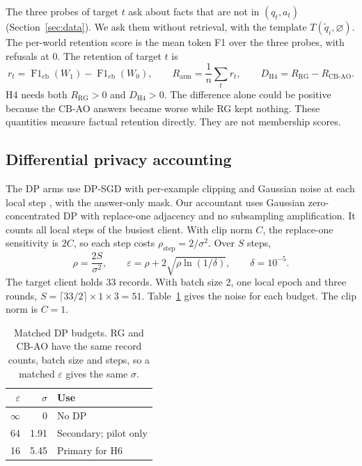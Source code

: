 \documentclass[11pt]{article}
\newcommand{\Fone}{\operatorname{F1}}
\begin{document}
The three probes of target $t$ ask about facts that are not in $(q_t,a_t)$ (Section~\ref{sec:data}). We ask them without retrieval, with the template $T(\tilde q_i,\varnothing)$. The per-world retention score is the mean token F1 over the three probes, with refusals at 0. The retention of target $t$ is
\begin{equation}
  r_t=\Fone_{\mathrm{cb}}(W_1)-\Fone_{\mathrm{cb}}(W_0),
  \qquad
  R_{\mathrm{arm}}=\frac1n\sum_{t}r_t,
  \qquad
  D_{\mathrm{H4}}=R_{\mathrm{RG}}-R_{\mathrm{CB\text{-}AO}}.
  \label{eq:retention}
\end{equation}
H4 needs both $R_{\mathrm{RG}}>0$ and $D_{\mathrm{H4}}>0$. The difference alone could be positive because the CB-AO answers became worse while RG kept nothing. These quantities measure factual retention directly. They are not membership scores.

\subsection{Differential privacy accounting}\label{sec:dp}

The DP arms use DP-SGD with per-example clipping and Gaussian noise at each local step \citep{abadi2016deep}, with the answer-only mask. Our accountant uses Gaussian zero-concentrated DP \citep{bun2016zcdp} with replace-one adjacency and no subsampling amplification. It counts all local steps of the busiest client. With clip norm $C$, the replace-one sensitivity is $2C$, so each step costs $\rho_{\mathrm{step}}=2/\sigma^2$. Over $S$ steps,
\begin{equation}
  \rho=\frac{2S}{\sigma^2},\qquad
  \varepsilon=\rho+2\sqrt{\rho\ln(1/\delta)},\qquad \delta=10^{-5}.
  \label{eq:zcdp}
\end{equation}
The target client holds 33 records. With batch size 2, one local epoch and three rounds, $S=\lceil 33/2\rceil\times1\times3=51$. Table~\ref{tab:sigma} gives the noise for each budget. The clip norm is $C=1$.

\begin{table}[htbp]
\centering
\caption{Matched DP budgets. RG and CB-AO have the same record counts, batch size and steps, so a matched $\varepsilon$ gives the same $\sigma$.}\label{tab:sigma}
\begin{tabular}{@{}rrl@{}}
\toprule
$\varepsilon$ & $\sigma$ & Use \\
\midrule
$\infty$ & 0 & No DP \\
64 & 1.91 & Secondary; pilot only \\
16 & 5.45 & Primary for H6 \\
\bottomrule
\end{tabular}
\end{table}
\end{document}
